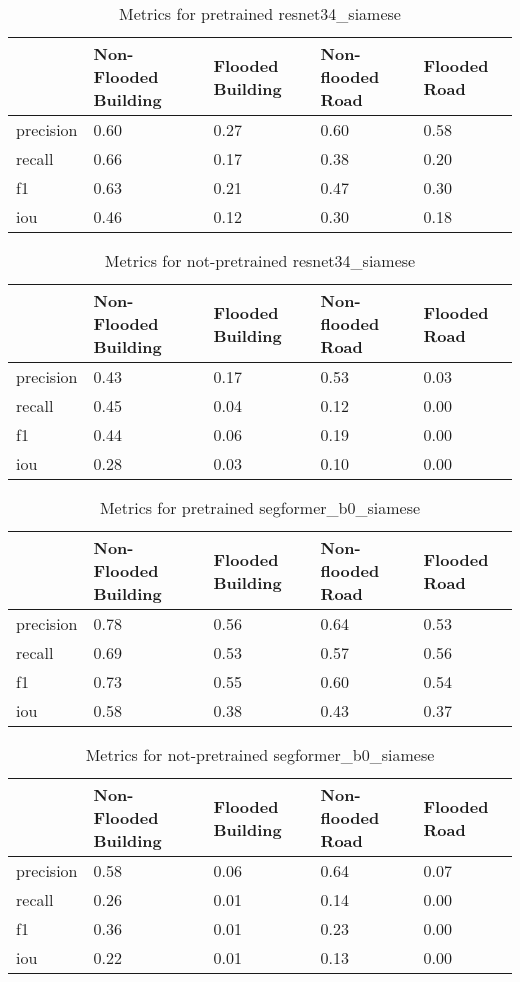 \begin{table}
    \begin{tabular}{lllll}
         & Non-Flooded Building & Flooded Building & Non-flooded Road & Flooded Road \\
        \hline
        precision & 0.60 & 0.27 & 0.60 & 0.58 \\
        recall & 0.66 & 0.17 & 0.38 & 0.20 \\
        f1 & 0.63 & 0.21 & 0.47 & 0.30 \\
        iou & 0.46 & 0.12 & 0.30 & 0.18 \\
    \end{tabular}
    \caption{Metrics for pretrained resnet34\_siamese}
\end{table}

\begin{table}
    \begin{tabular}{lllll}
         & Non-Flooded Building & Flooded Building & Non-flooded Road & Flooded Road \\
        \hline
        precision & 0.43 & 0.17 & 0.53 & 0.03 \\
        recall & 0.45 & 0.04 & 0.12 & 0.00 \\
        f1 & 0.44 & 0.06 & 0.19 & 0.00 \\
        iou & 0.28 & 0.03 & 0.10 & 0.00 \\
    \end{tabular}
    \caption{Metrics for not-pretrained resnet34\_siamese}
\end{table}

\begin{table}
    \begin{tabular}{lllll}
         & Non-Flooded Building & Flooded Building & Non-flooded Road & Flooded Road \\
        \hline
        precision & 0.78 & 0.56 & 0.64 & 0.53 \\
        recall & 0.69 & 0.53 & 0.57 & 0.56 \\
        f1 & 0.73 & 0.55 & 0.60 & 0.54 \\
        iou & 0.58 & 0.38 & 0.43 & 0.37 \\
    \end{tabular}
    \caption{Metrics for pretrained segformer\_b0\_siamese}
\end{table}

\begin{table}
    \begin{tabular}{lllll}
         & Non-Flooded Building & Flooded Building & Non-flooded Road & Flooded Road \\
        \hline
        precision & 0.58 & 0.06 & 0.64 & 0.07 \\
        recall & 0.26 & 0.01 & 0.14 & 0.00 \\
        f1 & 0.36 & 0.01 & 0.23 & 0.00 \\
        iou & 0.22 & 0.01 & 0.13 & 0.00 \\
    \end{tabular}
    \caption{Metrics for not-pretrained segformer\_b0\_siamese}
\end{table}

